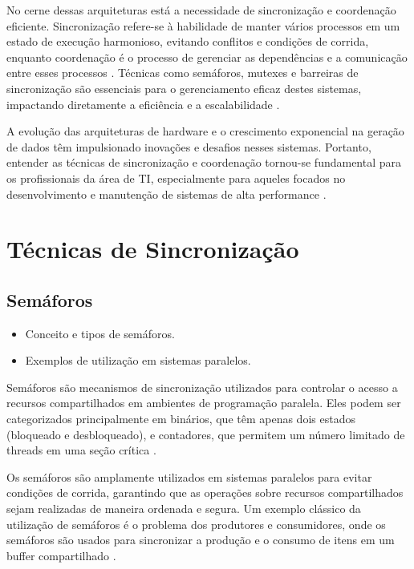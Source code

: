 \documentclass[conference]{IEEEtran}
\begin{document}
No cerne dessas arquiteturas está a necessidade de sincronização 
e coordenação eficiente. 
Sincronização refere-se à habilidade de manter vários processos 
em um estado de execução harmonioso, 
evitando conflitos e condições de corrida, 
enquanto coordenação é o processo de gerenciar 
as dependências e a comunicação 
entre esses processos \cite{andrews2000foundations}. 
Técnicas como semáforos, mutexes e 
barreiras de sincronização são essenciais para o 
gerenciamento eficaz destes sistemas, 
impactando diretamente a eficiência e a escalabilidade \cite{herlihy2011art}.

A evolução das arquiteturas de hardware 
e o crescimento exponencial na geração de dados têm impulsionado 
inovações e desafios nesses sistemas. 
Portanto, entender as técnicas de sincronização e coordenação 
tornou-se fundamental para os profissionais da área de TI, 
especialmente para aqueles focados no desenvolvimento e 
manutenção de sistemas de alta performance \cite{hennessy2011computer}.


\section{Técnicas de Sincronização}
\subsection{Semáforos}
\begin{itemize}
    \item Conceito e tipos de semáforos.
    \item Exemplos de utilização em sistemas paralelos.
\end{itemize}
Semáforos são mecanismos de sincronização utilizados para controlar o acesso a recursos compartilhados em ambientes de programação paralela. Eles podem ser categorizados principalmente em binários, que têm apenas dois estados (bloqueado e desbloqueado), e contadores, que permitem um número limitado de threads em uma seção crítica \cite{dijkstra1968semaphores}. 

Os semáforos são amplamente utilizados em sistemas paralelos para evitar condições de corrida, garantindo que as operações sobre recursos compartilhados sejam realizadas de maneira ordenada e segura. Um exemplo clássico da utilização de semáforos é o problema dos produtores e consumidores, onde os semáforos são usados para sincronizar a produção e o consumo de itens em um buffer compartilhado \cite{tanenbaum2007modern}.
\end{document}

